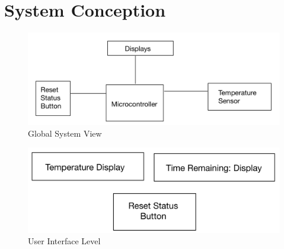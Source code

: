 \documentclass[12pt,jeep]{report}
\begin{document}
\linespread{1.0}

\linespread{2.0}

\tableofcontents
\newpage

\chapter{System Conception}
\begin{figure}[h]
  \centering
  \includegraphics[width=\textwidth]{../System-Conception/Figures/global-system-view.png}
  \caption{Global System View}
\end{figure}
\begin{figure}[h]
  \centering
  \includegraphics[width=\textwidth]{../System-Conception/Figures/user-interface-level.png}
  \caption{User Interface Level}
\end{figure}










\end{document}
